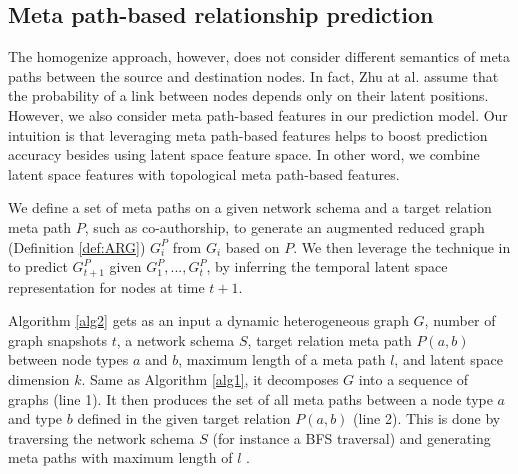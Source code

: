 \subsection{Meta path-based relationship prediction}

The homogenize approach, however, does not consider different semantics of meta paths between the source and destination nodes. In fact, Zhu at al. \cite{Zhu2016} assume that the probability of a link between nodes depends only on their latent positions. However, we also consider meta path-based features in our prediction model. Our intuition is that leveraging meta path-based features \cite{sun2011pathsim} helps to boost prediction accuracy besides using latent space feature space. In other word, we combine latent space features with topological meta path-based features.

We define a set of meta paths \cite{sun2011pathsim} on a given network schema and a target relation meta path $P$, such as co-authorship, to generate an augmented reduced graph (Definition \ref{def:ARG}) $G^P_i$ from $G_i$ based on $P$.  We then leverage the technique in \cite{Zhu2016} to predict $G^P_{t+1}$ given $G^P_1, ..., G^P_t$, by inferring the temporal latent space representation for nodes at time $t+1$.

Algorithm \ref{alg2} gets as an input a dynamic heterogeneous graph $G$, number of graph snapshots $t$, a network schema $S$, target relation meta path $P(a,b)$ between node types $a$ and $b$, maximum length of a meta path $l$, and latent space dimension $k$. Same as Algorithm \ref{alg1}, it decomposes $G$ into a sequence of graphs (line 1). It then produces the set of all meta paths between a node type $a$ and type $b$ defined in the given target relation $P(a,b)$ (line 2). This is done by traversing the network schema $S$ (for instance a BFS traversal) and generating meta paths with maximum length of $l$ .

